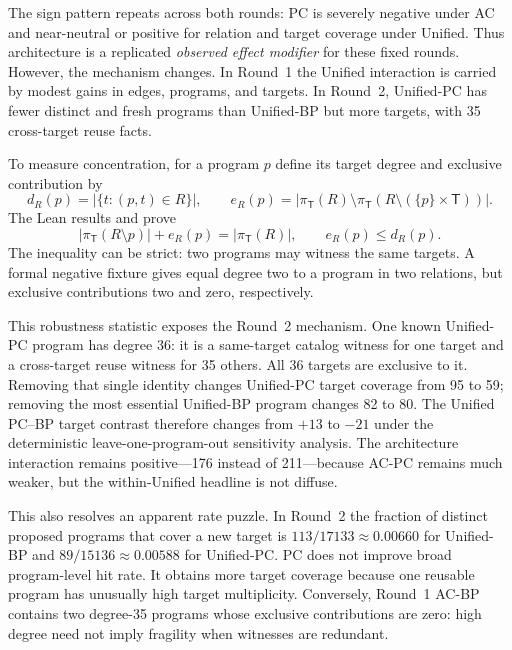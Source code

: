 \documentclass[11pt,openany]{report}
\begin{document}
The sign pattern repeats across both rounds: PC is severely negative under
AC and near-neutral or positive for relation and target coverage under
Unified.  Thus architecture is a replicated \emph{observed effect modifier}
for these fixed rounds.  However, the mechanism changes.  In Round~1 the
Unified interaction is carried by modest gains in edges, programs, and
targets.  In Round~2, Unified-PC has fewer distinct and fresh programs than
Unified-BP but more targets, with 35 cross-target reuse facts.

To measure concentration, for a program $p$ define its target degree and
exclusive contribution by
\[
 d_R(p)=|\{t:(p,t)\in R\}|,
 \qquad
 e_R(p)=|\pi_{\mathsf T}(R)\setminus
          \pi_{\mathsf T}(R\setminus(\{p\}\times\mathsf T))|.
\]
The Lean results  and
 prove
\[
 |\pi_{\mathsf T}(R\setminus p)|+e_R(p)=|\pi_{\mathsf T}(R)|,
 \qquad e_R(p)\le d_R(p).
\]
The inequality can be strict: two programs may witness the same targets.  A
formal negative fixture gives equal degree two to a program in two relations,
but exclusive contributions two and zero, respectively.

This robustness statistic exposes the Round~2 mechanism.  One known
Unified-PC program has degree 36: it is a same-target catalog witness for one
target and a cross-target reuse witness for 35 others.  All 36 targets are
exclusive to it.  Removing that single identity changes Unified-PC target
coverage from 95 to 59; removing the most essential Unified-BP program changes
82 to 80.  The Unified PC--BP target contrast therefore changes from $+13$ to
$-21$ under the deterministic leave-one-program-out sensitivity analysis.
The architecture interaction remains positive---176 instead of 211---because
AC-PC remains much weaker, but the within-Unified headline is not diffuse.

This also resolves an apparent rate puzzle.  In Round~2 the fraction of
distinct proposed programs that cover a new target is
$113/17133\approx0.00660$ for Unified-BP and
$89/15136\approx0.00588$ for Unified-PC.  PC does not improve broad
program-level hit rate.  It obtains more target coverage because one reusable
program has unusually high target multiplicity.  Conversely, Round~1 AC-BP
contains two degree-35 programs whose exclusive contributions are zero: high
degree need not imply fragility when witnesses are redundant.
\end{document}
